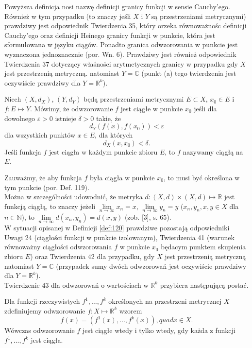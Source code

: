\documentclass[leqno]{article}
\begin{document}
\begin{justify}
Powyższa definicja nosi nazwę definicji granicy funkcji w sensie Cauchy'ego.
Również w tym przypadku (to znaczy jeśli $X$ i $Y$ są przestrzeniami metrycznymi)
prawdziwy jest odpowiednik Twierdzenia 35, który orzeka równoważnośc definicji Cauchy'ego oraz definicji Heinego granicy funkcji w punkcie, która jest sformułowana w języku ciągów.
Ponadto granica odwzorowania w punkcie jest wyznaczona jednoznacznie (por. Wn. 6). 
Prawdziwy jest również odpowiednik Twierdzenia 37 dotyczący właśności arytmetycznych granicy w przypadku gdy $X$ jest przestrzenią metryczną. natomiast $Y = \mathbb{C}$ (punkt (a) tego twierdzenia jest oczywiście prawdziwy dla $Y = \mathbb{R}^k$).

\begin{defn}
    Niech $(X, d_X)$, $(Y, d_Y)$ będą przestrzeniami metrycznymi $E \subset X$, $x_0 \in E$ i $f : E \mapsto Y$. Mówimy, że odwzorowanie $f$ jest ciągłe w punkcie $x_0$ jeśli dla dowolnego $\varepsilon > 0$ istnieje $\delta > 0$ takie, że
    \[
        d_Y(f(x), f(x_0)) < \varepsilon
    \]
    dla wszystkich punktów $x \in E$, dla których
    \[
        d_X(x, x_0) < \delta.
    \]
    Jeśli funkcja $f$ jest ciągła w każdym punkcie zbioru $E$, to $f$ nazywamy ciągłą na $E$.
\end{defn}

Zauważmy, że aby funkcja $f$ była ciągła w punkcie $x_0$, to musi być określona w tym punkcie (por. Def. 119). \\
Można w szczególności udowodnić, że metryka $d : (X, d) \times (X, d) \mapsto \mathbb{R}$ jest funkcją ciągłą, to znaczy jeżeli $\lim\limits_{n \to \infty}x_n = x$, $\lim\limits_{n \to \infty}y_n = y$ ($x_n, y_n, x, y \in X$ dla $n \in \mathbb{N}$), to $\lim\limits_{n \to \infty}d(x_n, y_n) = d(x, y)$ (zob. [3], s. 65). \\
W sytuacji opisanej w Definicji \ref{def:120} prawdziwe pozostają odpowiedniki Uwagi 24 (ciągłości funkcji w punkcie izolowanym), Twierdzenia 41 (warunek równoważny ciągłości odwzorowania $f$ w punkcie $x_0$ będacym punktem skupienia zbioru $E$) oraz Twierdzenia 42 dla przypadku, gdy $X$ jest przestrzenią metryczną natomiast $Y = \mathbb{C}$ (przypadek sumy dwóch odwzorowań jest oczywiście prawdziwy dla $Y = \mathbb{R}^k$). \\
Twierdzenie 43 dla odwzorowań o wartościach w $\mathbb{R}^k$ przybiera następującą postać.

\begin{theorem}
{
    Dla funkcji rzeczywistych $f^1, \ldots, f^k$ określonych na przestrzeni metrycznej $X$ zdefiniujemy odwzorowanie $f : X \mapsto \mathbb{R}^k$ wzorem 
    \[
        f(x) = (f^1(x), \ldots, f^k(x)), quad x \in X.
    \]
    Wówczas odwzorowanie $f$ jest ciągłe wtedy i tylko wtedy, gdy każda z funkcji $f^1, \ldots, f^k$ jest ciągła.
}
\end{theorem}


\end{justify}
\end{document}
